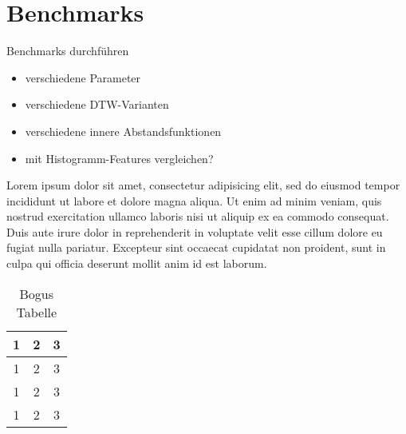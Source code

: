 \chapter{Benchmarks} %
\label{cha:benchmarks}

\TODO Benchmarks durchführen

\begin{itemize}
  \item verschiedene Parameter
  \item verschiedene DTW-Varianten
  \item verschiedene innere Abstandsfunktionen
  \item mit Histogramm-Features vergleichen?
\end{itemize}

Lorem ipsum dolor sit amet, consectetur adipisicing elit, sed do eiusmod tempor incididunt ut labore et dolore magna aliqua. Ut enim ad minim veniam, quis nostrud exercitation ullamco laboris nisi ut aliquip ex ea commodo consequat. Duis aute irure dolor in reprehenderit in voluptate velit esse cillum dolore eu fugiat nulla pariatur. Excepteur sint occaecat cupidatat non proident, sunt in culpa qui officia deserunt mollit anim id est laborum.

\begin{table}
  \centering
  \begin{tabular}{|ccc|}
    \hline
    1 & 2 & 3 \\ \hline
    1 & 2 & 3 \\
    1 & 2 & 3 \\
    1 & 2 & 3 \\
    \hline
  \end{tabular}
  \caption{Bogus Tabelle}
\end{table}

